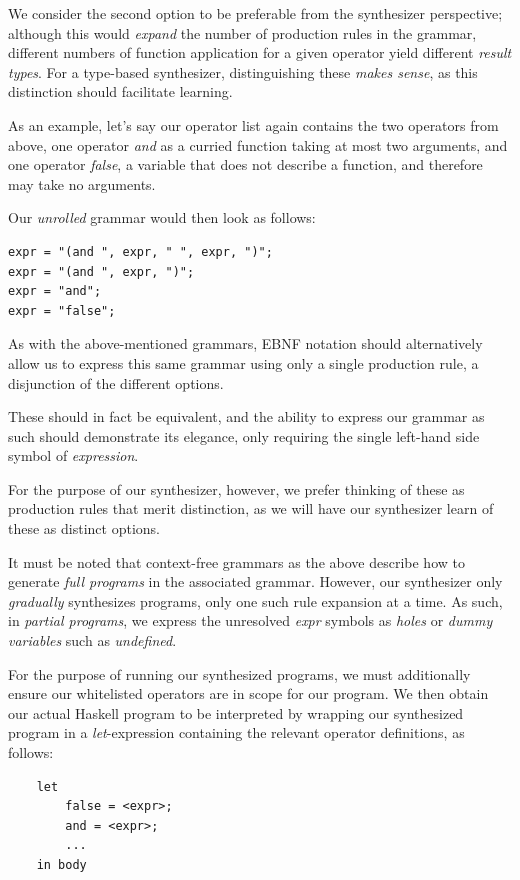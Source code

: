 \documentclass{article}
\begin{document}
We consider the second option to be preferable from the synthesizer perspective;
although this would \emph{expand} the number of production rules in the grammar,
different numbers of function application for a given operator yield different \emph{result types}.
For a type-based synthesizer, distinguishing these \emph{makes sense},
as this distinction should facilitate learning.

As an example, let's say our operator list again contains the two operators from above,
one operator \emph{and} as a curried function taking at most two arguments,
and one operator \emph{false}, a variable that does not describe a function,
and therefore may take no arguments.

Our \emph{unrolled} grammar would then look as follows:
\begin{verbatim}
expr = "(and ", expr, " ", expr, ")";
expr = "(and ", expr, ")";
expr = "and";
expr = "false";
\end{verbatim}

As with the above-mentioned grammars,
EBNF notation should alternatively allow us to express
this same grammar using only a single production rule,
a disjunction of the different options.

These should in fact be equivalent,
and the ability to express our grammar as such should demonstrate its elegance,
only requiring the single left-hand side symbol of \emph{expression}.

For the purpose of our synthesizer, however,
we prefer thinking of these as production rules that merit distinction,
as we will have our synthesizer learn of these as distinct options.

It must be noted that context-free grammars
as the above
describe how to generate \emph{full programs} in the associated grammar.
However, our synthesizer only \emph{gradually} synthesizes programs,
only one such rule expansion at a time.
As such, in \emph{partial programs},
we express the unresolved \emph{expr} symbols as
\emph{holes} or \emph{dummy variables} such as \emph{undefined}.

For the purpose of running our synthesized programs,
we must additionally ensure our whitelisted operators are in scope for our program.
We then obtain our actual Haskell program to be interpreted
by wrapping our synthesized program in a \emph{let}-expression
containing the relevant operator definitions, as follows:

\begin{verbatim}
    let
        false = <expr>;
        and = <expr>;
        ...
    in body
\end{verbatim}
\end{document}
